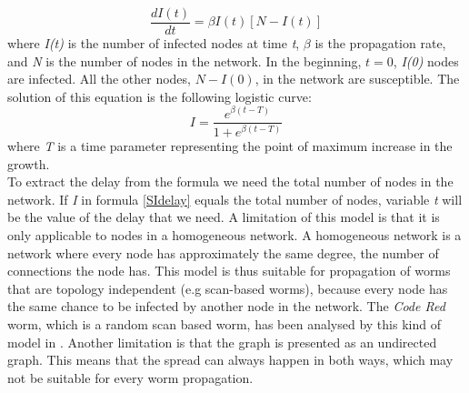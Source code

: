 \begin{equation}
\dfrac{d I(t)}{dt} = \beta I(t)[N-I(t)]
\end{equation} 
where \textit{I(t)} is the number of infected nodes at time \textit{t}, $\beta$ is the propagation rate, and \textit{N} is the number of nodes in the network. In the beginning, $t=0$, \textit{I(0)} nodes are infected. All the other nodes, $N - I(0)$, in the network are susceptible. 
The solution of this equation is the following logistic curve:
\begin{equation}
I = \dfrac{e^{\beta(t-T)}}{1+e^{\beta(t-T)}}
\label{SIdelay}
\end{equation}
where \textit{T} is a time parameter representing the point of maximum increase in the growth.\\


To extract the delay from the formula we need the total number of nodes in the network. If \textit{I} in formula \ref{SIdelay} equals the total number of nodes, variable \textit{t} will be the value of the delay that we need. A limitation of this model is that it is only applicable to nodes in a homogeneous network. A homogeneous network is a network where every node has approximately the same degree, the number of connections the node has. This model is thus suitable for propagation of worms that are topology independent (e.g scan-based worms), because every node has the same chance to be infected by another node in the network. The \textit{Code Red} worm, which is a random scan based worm, has been analysed by this kind of model in \cite{OwnInternetSI}. Another limitation is that the graph is presented as an undirected graph. This means that the spread can always happen in both ways, which may not be suitable for every worm propagation. 

